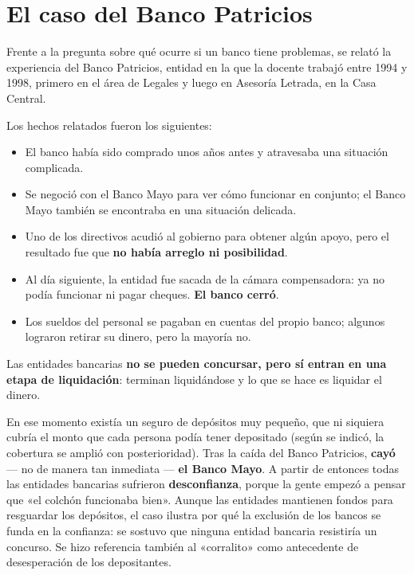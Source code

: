 \documentclass[12pt,oneside]{book}
\begin{document}
\section{El caso del Banco Patricios}

Frente a la pregunta sobre qué ocurre si un banco tiene problemas, se relató la experiencia del Banco Patricios, entidad en la que la docente trabajó entre 1994 y 1998, primero en el área de Legales y luego en Asesoría Letrada, en la Casa Central.

Los hechos relatados fueron los siguientes:

\begin{itemize}
    \item El banco había sido comprado unos años antes y atravesaba una situación complicada.
    \item Se negoció con el Banco Mayo para ver cómo funcionar en conjunto; el Banco Mayo también se encontraba en una situación delicada.
    \item Uno de los directivos acudió al gobierno para obtener algún apoyo, pero el resultado fue que \textbf{no había arreglo ni posibilidad}.
    \item Al día siguiente, la entidad fue sacada de la cámara compensadora: ya no podía funcionar ni pagar cheques. \textbf{El banco cerró}.
    \item Los sueldos del personal se pagaban en cuentas del propio banco; algunos lograron retirar su dinero, pero la mayoría no.
\end{itemize}

\begin{important}
Las entidades bancarias \textbf{no se pueden concursar, pero sí entran en una etapa de liquidación}: terminan liquidándose y lo que se hace es liquidar el dinero.
\end{important}

En ese momento existía un seguro de depósitos muy pequeño, que ni siquiera cubría el monto que cada persona podía tener depositado (según se indicó, la cobertura se amplió con posterioridad). Tras la caída del Banco Patricios, \textbf{cayó} --- no de manera tan inmediata --- \textbf{el Banco Mayo}. A partir de entonces todas las entidades bancarias sufrieron \textbf{desconfianza}, porque la gente empezó a pensar que «el colchón funcionaba bien». Aunque las entidades mantienen fondos para resguardar los depósitos, el caso ilustra por qué la exclusión de los bancos se funda en la confianza: se sostuvo que ninguna entidad bancaria resistiría un concurso. Se hizo referencia también al «corralito» como antecedente de desesperación de los depositantes.
\end{document}

